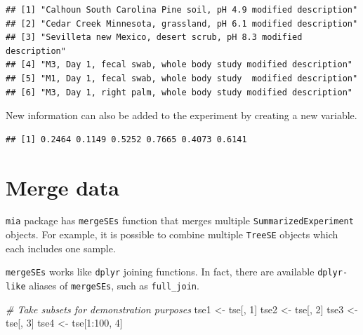 \documentclass[
]{book}
\newenvironment{Shaded}{\begin{snugshade}}{\end{snugshade}}
\newcommand{\CommentTok}[1]{\textcolor[rgb]{0.56,0.35,0.01}{\textit{#1}}}
\newcommand{\DecValTok}[1]{\textcolor[rgb]{0.00,0.00,0.81}{#1}}
\newcommand{\FunctionTok}[1]{\textcolor[rgb]{0.00,0.00,0.00}{#1}}
\newcommand{\NormalTok}[1]{#1}
\newcommand{\OtherTok}[1]{\textcolor[rgb]{0.56,0.35,0.01}{#1}}
\newcommand{\SpecialCharTok}[1]{\textcolor[rgb]{0.00,0.00,0.00}{#1}}
\begin{document}
\begin{verbatim}
## [1] "Calhoun South Carolina Pine soil, pH 4.9 modified description"  
## [2] "Cedar Creek Minnesota, grassland, pH 6.1 modified description"  
## [3] "Sevilleta new Mexico, desert scrub, pH 8.3 modified description"
## [4] "M3, Day 1, fecal swab, whole body study modified description"   
## [5] "M1, Day 1, fecal swab, whole body study  modified description"  
## [6] "M3, Day 1, right palm, whole body study modified description"
\end{verbatim}

New information can also be added to the experiment by creating a new variable.

\begin{Shaded}
\end{Shaded}

\begin{verbatim}
## [1] 0.2464 0.1149 0.5252 0.7665 0.4073 0.6141
\end{verbatim}

\hypertarget{merge-data}{%
\section{Merge data}\label{merge-data}}

\texttt{mia} package has \texttt{mergeSEs} function that merges multiple \texttt{SummarizedExperiment}
objects. For example, it is possible to combine multiple \texttt{TreeSE} objects which each
includes one sample.

\texttt{mergeSEs} works like \texttt{dplyr} joining functions. In fact, there are available
\texttt{dplyr-like} aliases of \texttt{mergeSEs}, such as \texttt{full\_join}.

\begin{Shaded}
\begin{Highlighting}[]
\CommentTok{\# Take subsets for demonstration purposes}
\NormalTok{tse1 }\OtherTok{\textless{}{-}}\NormalTok{ tse[, }\DecValTok{1}\NormalTok{]}
\NormalTok{tse2 }\OtherTok{\textless{}{-}}\NormalTok{ tse[, }\DecValTok{2}\NormalTok{]}
\NormalTok{tse3 }\OtherTok{\textless{}{-}}\NormalTok{ tse[, }\DecValTok{3}\NormalTok{]}
\NormalTok{tse4 }\OtherTok{\textless{}{-}}\NormalTok{ tse[}\DecValTok{1}\SpecialCharTok{:}\DecValTok{100}\NormalTok{, }\DecValTok{4}\NormalTok{]}
\end{Highlighting}
\end{Shaded}
\end{document}

